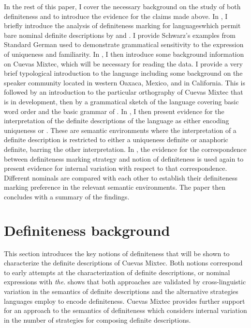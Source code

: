 \documentclass[output=paper,modfonts,nonflat]{langsci/langscibook}
\begin{document}
In the rest of this paper, I cover the necessary background on the study of both definiteness and  to introduce the evidence for the claims made above. In , I briefly introduce the analysis of definiteness marking for languages\linebreak which permit bare nominal definite descriptions by \citeauthor{Schwarz2009} and \citeauthor{Jenks2015}. I provide Schwarz's examples from Standard German used to demonstrate grammatical sensitivity to the expression of uniqueness and familiarity.  In , I then introduce some background information on Cuevas Mixtec, which will be necessary for reading the data.  I provide a very brief typological introduction to the language including some background on the speaker community located in western Oaxaca, Mexico, and in California.  This is followed by an introduction to the particular orthography of Cuevas Mixtec that is in development, then by a grammatical sketch of the language covering basic word order and the basic grammar of . In , I then present evidence for the interpretation of the definite descriptions of the language as either encoding uniqueness or .  These are semantic environments where the interpretation of a definite description is restricted to either a uniqueness definite or anaphoric definite, barring the other interpretation.  In , the evidence for the correspondence between definiteness marking strategy and notion of definiteness is used again to present evidence for internal variation with respect to that correspondence.  Different nominals are compared with each other to establish their definiteness marking preference in the relevant semantic environments.  The paper then concludes with a summary of the findings.

\section{Definiteness background} \label{sec:cisneros:2}

This section introduces the key notions of definiteness that will be shown to characterize the definite descriptions of Cuevas Mixtec.  Both notions correspond to early attempts at the characterization of  definite descriptions, or nominal expressions with \textit{the}.  \citet{Schwarz2009} shows that both approaches are validated by cross-linguistic variation in the semantics of definite descriptions and the alternative strategies languages employ to encode definiteness.  Cuevas Mixtec provides further support for an approach to the semantics of definiteness which considers internal variation in the number of strategies for composing definite descriptions. 
\end{document}
